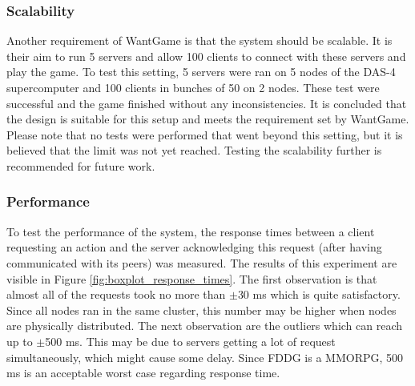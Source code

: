 	\subsubsection{Scalability}
	\label{subsubsec:scalability} 
		Another requirement of WantGame is that the system should be scalable. It is their aim to run 5 servers and allow 100 clients to connect with these servers and play the game.
		To test this setting, 5 servers were ran on 5 nodes of the DAS-4 supercomputer and 100 clients in bunches of 50 on 2 nodes. These test were successful and the game finished without any inconsistencies. It is concluded that the design is suitable for this setup and meets the requirement set by WantGame.
		Please note that no tests were performed that went beyond this setting, but it is believed that the limit was not yet reached. Testing the scalability further is recommended for future work.
		
	\subsubsection{Performance}
	\label{subsubsec:performance}
		To test the performance of the system, the response times between a client requesting an action and the server acknowledging this request (after having communicated with its peers) was measured. 
		The results of this experiment are visible in Figure \ref{fig:boxplot_response_times}.
		The first observation is that almost all of the requests took no more than $\pm$30 ms which is quite satisfactory. Since all nodes ran in the same cluster, this number may be higher when nodes are physically distributed.
		The next observation are the outliers which can reach up to $\pm$500 ms. 
		This may be due to servers getting a lot of request simultaneously, which might cause some delay.
		Since FDDG is a MMORPG, 500 ms is an acceptable worst case regarding response time.
		
